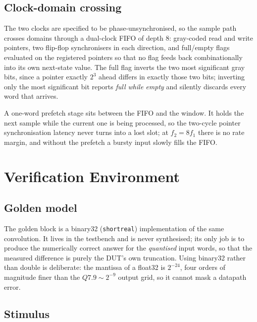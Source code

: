 \documentclass[conference]{IEEEtran}
\newcommand{\qf}[2]{Q#1.#2}
\begin{document}
\subsection{Clock-domain crossing}

The two clocks are specified to be phase-unsynchronised, so the sample path
crosses domains through a dual-clock FIFO of depth 8: gray-coded read and
write pointers, two flip-flop synchronisers in each direction, and full/empty
flags evaluated on the registered pointers so that no flag feeds back
combinationally into its own next-state value. The full flag inverts the two
most significant gray bits, since a pointer exactly $2^{3}$ ahead differs in
exactly those two bits; inverting only the most significant bit reports
\emph{full while empty} and silently discards every word that arrives.

A one-word prefetch stage sits between the FIFO and the window. It holds the
next sample while the current one is being processed, so the two-cycle pointer
synchronisation latency never turns into a lost slot; at $f_2 = 8f_1$ there is
no rate margin, and without the prefetch a bursty input slowly fills the FIFO.

\section{Verification Environment}\label{sec:tb}

\subsection{Golden model}

The golden block is a binary32 (\texttt{shortreal}) implementation of the same
convolution. It lives in the testbench and is never synthesised; its only job
is to produce the numerically correct answer for the \emph{quantised} input
words, so that the measured difference is purely the DUT's own truncation.
Using binary32 rather than double is deliberate: the mantissa of a float32 is
$2^{-24}$, four orders of magnitude finer than the $\qf{7}{9} \sim 2^{-9}$
output grid, so it cannot mask a datapath error.

\subsection{Stimulus}
\end{document}
